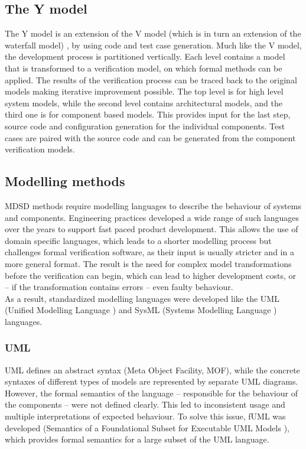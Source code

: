   \subsection{The Y model}
The Y model is an extension of the V model (which is in turn an extension of the waterfall model) \cite{randomwikipedialink3}, by using code and test case generation. Much like the V model, the development process is partitioned vertically. Each level contains a model that is transformed to a verification model, on which formal methods can be applied. The results of the verification process can be traced back to the original models making iterative improvement possible. The top level is for high level system models, while the second level contains architectural models, and the third one is for component based models. This provides input for the last step, source code and configuration generation for the individual components. Test cases are paired with the source code and can be generated from the component verification models.
  \subsection{Modelling methods}
MDSD methods require modelling languages to describe the behaviour of systems and components. Engineering practices developed a wide range of such languages over the years to support fast paced product development. This allows the use of domain specific languages, which leads to a shorter modelling process but challenges formal verification software, as their input is usually stricter and in a more general format. The result is the need for complex model transformations before the verification can begin, which can lead to higher development costs, or -- if the transformation contains errors -- even faulty behaviour.\\
As a result, standardized modelling languages were developed like the UML (Unified Modelling Language \cite{uml}) and SysML (Systems Modelling Language \cite{sysml}) languages.
    \subsubsection{UML}
UML defines an abstract syntax (Meta Object Facility, MOF), while the concrete syntaxes of different types of models are represented by separate UML diagrams.\\
However, the formal semantics of the language -- responsible for the behaviour of the components -- were not defined clearly. This led to inconsistent usage and multiple interpretations of expected behaviour. To solve this issue, fUML was developed (Semantics of a Foundational Subset for Executable UML Models \cite{fuml}), which provides formal semantics for a large subset of the UML language.
